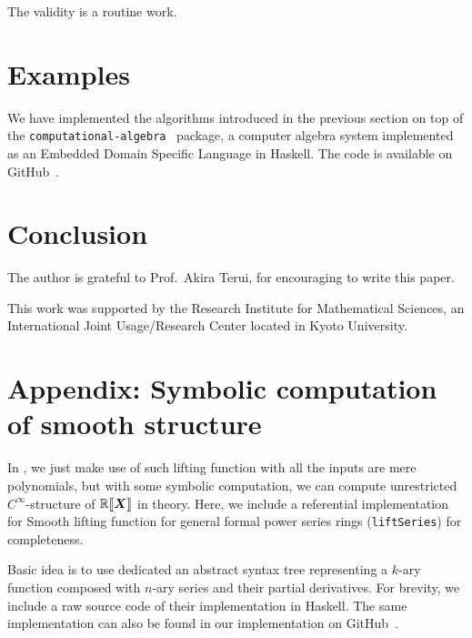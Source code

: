 \documentclass[%
  sigconf,authorversion,screen]{acmart}
\begin{document}
The validity is a routine work.

\section{Examples}\label{sec:examples}
We have implemented the algorithms introduced in the previous section on top of the \texttt{computational-algebra}~\cite{ISHII:2018ek,computational-algebra} package, a computer algebra system implemented as an Embedded Domain Specific Language in Haskell.
The code is available on GitHub~\cite{Ishii:2020aa}.

\section{Conclusion}\label{sec:concl}

\begin{acks}
The author is grateful to Prof.\ Akira Terui, for encouraging  to write this paper.

This work was supported by the Research Institute for Mathematical Sciences,
an International Joint Usage/Research Center located in Kyoto University.
\end{acks}

\section{Appendix: Symbolic computation of smooth structure }\label{sec:appendix}
In , we just make use of such lifting function with all the inputs are mere polynomials, but with some symbolic computation, we can compute unrestricted $C^\infty$-structure of $\mathord{\mathbb{R}\llbracket\boldsymbol{X}\rrbracket}$ in theory.
Here, we include a referential implementation for Smooth lifting function for general formal power series rings (\texttt{liftSeries}) for completeness.

Basic idea is to use dedicated an abstract syntax tree representing a $k$-ary function composed with $n$-ary series and their partial derivatives.
For brevity, we include a raw source code of their implementation in Haskell.
The same implementation can also be found in our implementation on GitHub~\cite{Ishii:2020aa}.
\end{document}
